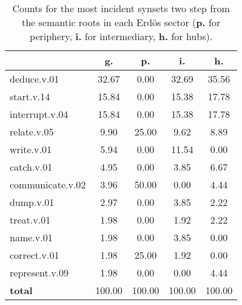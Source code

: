 \begin{table}[h!]
\begin{center}
\begin{tabular}{| l || c | c | c | c |}\hline
 & {\bf g.} & {\bf p.} & {\bf i.} & {\bf h.} \\\hline\hline
deduce.v.01 & 32.67  & 0.00  & 32.69  & 35.56 \\\hline
start.v.14 & 15.84  & 0.00  & 15.38  & 17.78 \\\hline
interrupt.v.04 & 15.84  & 0.00  & 15.38  & 17.78 \\\hline
relate.v.05 & 9.90  & 25.00  & 9.62  & 8.89 \\\hline
write.v.01 & 5.94  & 0.00  & 11.54  & 0.00 \\\hline
catch.v.01 & 4.95  & 0.00  & 3.85  & 6.67 \\\hline
communicate.v.02 & 3.96  & 50.00  & 0.00  & 4.44 \\\hline
dump.v.01 & 2.97  & 0.00  & 3.85  & 2.22 \\\hline
treat.v.01 & 1.98  & 0.00  & 1.92  & 2.22 \\\hline
name.v.01 & 1.98  & 0.00  & 3.85  & 0.00 \\\hline
correct.v.01 & 1.98  & 25.00  & 1.92  & 0.00 \\\hline
represent.v.09 & 1.98  & 0.00  & 0.00  & 4.44 \\\hline\hline
{{\bf total}} & 100.00  & 100.00  & 100.00  & 100.00 \\\hline
\end{tabular}
\caption{Counts for the most incident synsets two step from the semantic roots in each Erd\"os sector ({\bf p.} for periphery, {\bf i.} for intermediary, {\bf h.} for hubs).}
\end{center}
\end{table}